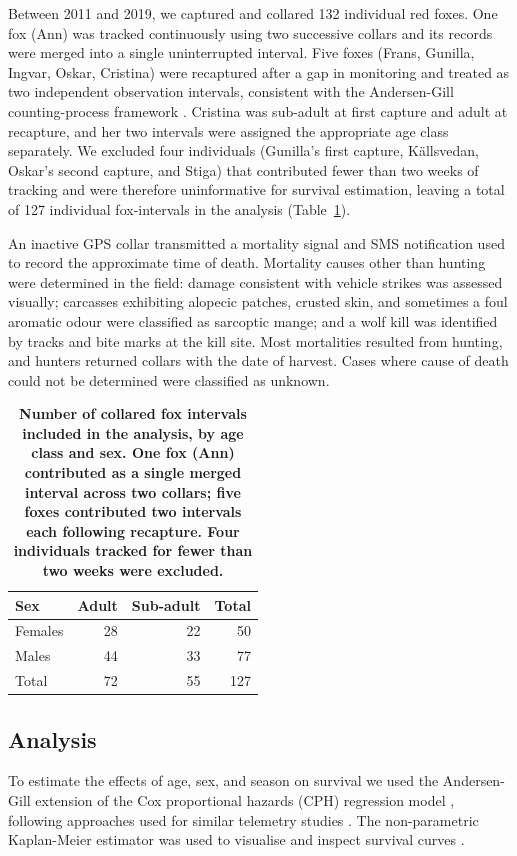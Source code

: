 Between 2011 and 2019, we captured and collared 132 individual red foxes.
One fox (Ann) was tracked continuously using two successive collars and its
records were merged into a single uninterrupted interval. Five foxes (Frans,
Gunilla, Ingvar, Oskar, Cristina) were recaptured after a gap in monitoring and
treated as two independent observation intervals, consistent with the
Andersen-Gill counting-process framework \citep{andersenCoxsRegressionModel1982}.
Cristina was sub-adult at first capture and adult at recapture, and her two
intervals were assigned the appropriate age class separately. We excluded four
individuals (Gunilla's first capture, Källsvedan, Oskar's second capture, and
Stiga) that contributed fewer than two weeks of tracking and were therefore
uninformative for survival estimation, leaving a total of 127 individual
fox-intervals in the analysis (Table~\ref{table:capt}).

An inactive GPS collar transmitted a mortality signal and SMS notification used
to record the approximate time of death. Mortality causes other than hunting
were determined in the field: damage consistent with vehicle strikes was
assessed visually; carcasses exhibiting alopecic patches, crusted skin, and
sometimes a foul aromatic odour were classified as sarcoptic mange; and a wolf
kill was identified by tracks and bite marks at the kill site. Most mortalities
resulted from hunting, and hunters returned collars with the date of harvest.
Cases where cause of death could not be determined were classified as unknown.

\begin{table}[t]
\centering
\captionsetup{font=small}
\caption{\textbf{Number of collared fox intervals included in the analysis,
  by age class and sex. One fox (Ann) contributed as a single merged interval
  across two collars; five foxes contributed two intervals each following
  recapture. Four individuals tracked for fewer than two weeks were
  excluded.}}
\label{table:capt}
\begin{tabular}{lrr|r}
\toprule
Sex     & Adult & Sub-adult & Total \\
\midrule
Females & 28    & 22        & 50    \\
Males   & 44    & 33        & 77    \\
\midrule
Total   & 72    & 55        & 127   \\
\bottomrule
\end{tabular}
\end{table}

\subsection*{Analysis}
To estimate the effects of age, sex, and season on survival we used the
Andersen-Gill extension of the Cox proportional hazards (CPH) regression model
\citep{andersenCoxsRegressionModel1982}, following approaches used for similar
telemetry studies \citep{johnsonModelingSurvivalApplication2004,
ahlenSurvivalFemaleCapercaillie2013}. The non-parametric Kaplan-Meier estimator
was used to visualise and inspect survival curves
\citep{pollockSurvivalAnalysisTelemetry1989}.

